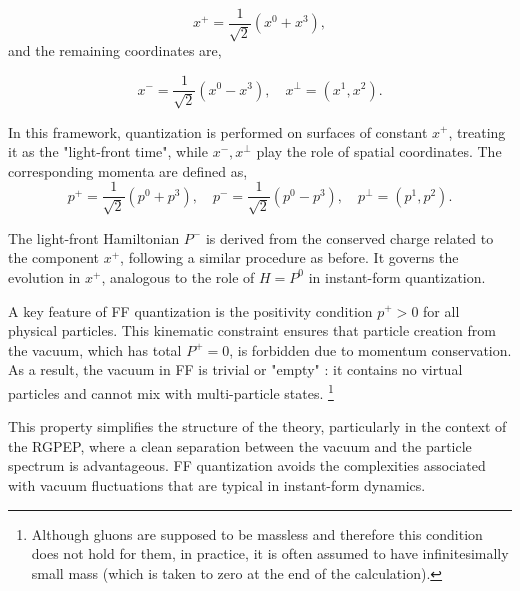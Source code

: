 \documentclass[11pt,a4paper,twoside,pdf]{article}
\numberwithin{equation}{section}
\begin{document}
\begin{equation}
    x^+ = \frac{1}{\sqrt{2}} (x^0 + x^3),
\end{equation}
and the remaining coordinates are,

\begin{equation}
    x^- = \frac{1}{\sqrt{2}} (x^0 - x^3), \quad x^\perp = (x^1, x^2).
\end{equation}

In this framework, quantization is performed on surfaces of constant \( x^+ \), 
treating it as the "light-front time", while \( x^-, x^\perp \) play the role 
of spatial coordinates. The corresponding momenta are defined as,
\begin{equation}
    p^+ = \frac{1}{\sqrt{2}} (p^0 + p^3), \quad
    p^- = \frac{1}{\sqrt{2}} (p^0 - p^3), \quad
    p^\perp = (p^1, p^2).
\end{equation}

The light-front Hamiltonian \( P^- \) is derived from the conserved charge related 
to the component \( x^+ \), following a similar procedure as before. It governs 
the evolution in \( x^+ \), analogous to the role of \( H = P^0 \) in instant-form 
quantization.

A key feature of FF quantization is the positivity condition \( p^+ > 0 \) 
for all physical particles. This kinematic constraint ensures that particle 
creation from the vacuum, which has total \( P^+ = 0 \), is forbidden due to 
momentum conservation. As a result, the vacuum in FF is trivial or "empty" \cite{Brodsky_1998}: 
it contains no virtual particles and cannot mix with multi-particle states.
\footnote{Although gluons are supposed to be massless and therefore this condition
does not hold for them, in practice, it is often assumed to have infinitesimally 
small mass (which is taken to zero at the end of the calculation).}

This property simplifies the structure of the theory, particularly in the 
context of the RGPEP, where a clean separation between the vacuum and 
the particle spectrum is advantageous. FF quantization avoids the 
complexities associated with vacuum fluctuations that are typical in 
instant-form dynamics.
\end{document}
